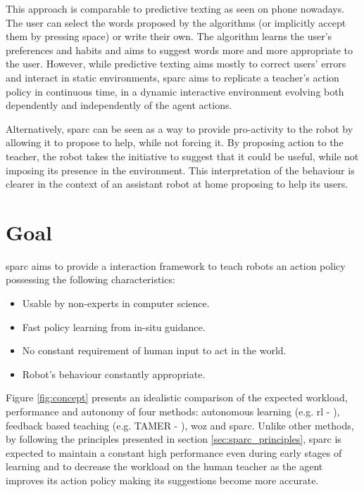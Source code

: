 This approach is comparable to predictive texting as seen on phone nowadays. The user can select the words proposed by the algorithms (or implicitly accept them by pressing space) or write their own. The algorithm learns the user's preferences and habits and aims to suggest words more and more appropriate to the user. However, while predictive texting aims mostly to correct users' errors and interact in static environments, \gls{sparc} aims to replicate a teacher's action policy in continuous time, in a dynamic interactive environment evolving both dependently and independently of the agent actions.

Alternatively, \gls{sparc} can be seen as a way to provide pro-activity to the robot by allowing it to propose to help, while not forcing it. By proposing action to the teacher, the robot takes the initiative to suggest that it could be useful, while not imposing its presence in the environment. This interpretation of the behaviour is clearer in the context of an assistant robot at home proposing to help its users.

\section{Goal}

\gls{sparc} aims to provide a interaction framework to teach robots an action policy possessing the following characteristics:
\begin{itemize}
	\item Usable by non-experts in computer science.
	\item Fast policy learning from in-situ guidance.
	\item No constant requirement of human input to act in the world.
	\item Robot's behaviour constantly appropriate.
\end{itemize}

Figure \ref{fig:concept} presents an idealistic comparison of the expected workload, performance and autonomy of four methods: autonomous learning (e.g. \gls{rl} - \citealt{sutton1998reinforcement}), feedback based teaching (e.g. TAMER - \citealt{knox2009interactively}), \gls{woz} and \gls{sparc}. Unlike other methods, by following the principles presented in section \ref{sec:sparc_principles}, \gls{sparc} is expected to maintain a constant high performance even during early stages of learning and to decrease the workload on the human teacher as the agent improves its action policy making its suggestions become more accurate.

